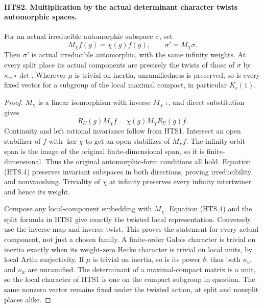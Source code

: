 \paragraph{HTS2. Multiplication by the actual determinant character twists automorphic spaces.}
\label{claim:HTS2}
For an actual irreducible automorphic subspace $\sigma$, set
\[
          M_\chi f(g)=\chi(g)f(g),\qquad \sigma'=M_\chi\sigma.
                                                               \tag{HTS.3}
\]
Then $\sigma'$ is actual irreducible automorphic, with the same
infinity weights.  At every split place its actual components
are precisely the twists of those of $\sigma$ by
$\kappa_w\circ\det$.  Wherever $\mu$ is trivial on inertia,
unramifiedness is preserved; so is every fixed vector for a
subgroup of the local maximal compact, in particular $K_c(1)$.
\begin{proof}
$M_\chi$ is a linear isomorphism with inverse $M_{\chi^{-1}}$,
and direct substitution gives
\[
          R_U(g)M_\chi f=\chi(g)M_\chi R_U(g)f.                 \tag{HTS.4}
\]
Continuity and left rational invariance follow from HTS1.
Intersect an open stabilizer of $f$ with $\ker\chi$ to get
an open stabilizer of $M_\chi f$.  The infinity orbit span
is the image of the original finite-dimensional span, so it
is finite-dimensional.  Thus the original automorphic-form
conditions all hold.  Equation (HTS.4) preserves invariant
subspaces in both directions, proving irreducibility and
nonvanishing.  Triviality of $\chi$ at infinity preserves
every infinity intertwiner and hence its weight.

Compose any local-component embedding with $M_\chi$.
Equation (HTS.4) and the split formula in HTS1 give exactly
the twisted local representation.  Conversely use the inverse
map and inverse twist.  This proves the statement for every
actual component, not just a chosen family.  A finite-order
Galois character is trivial on inertia exactly when its
weight-zero Hecke character is trivial on local units, by
local Artin surjectivity.  If $\mu$ is trivial on inertia,
so is its power $\delta$; thus both $\kappa_w$ and $\nu_w$
are unramified.  The determinant of a maximal-compact matrix
is a unit, so the local character of HTS1 is one on the
compact subgroup in question.  The same nonzero vector
remains fixed under the twisted action, at split and nonsplit
places alike.
\end{proof}

